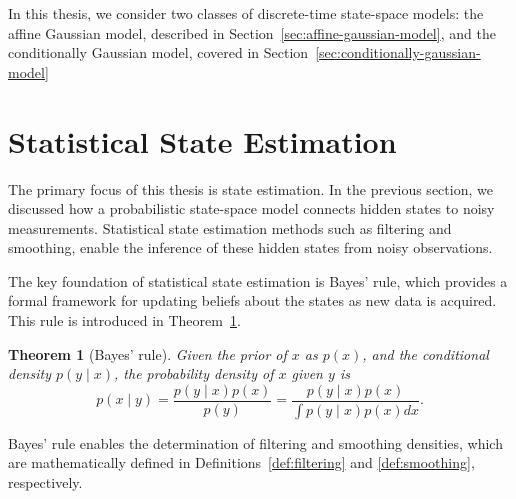 \documentclass[dissertation,math,vertlayout,pdfa,colorlinks,nologo]{aaltoseries}
\newtheorem{theorem}{Theorem}
\begin{document}
In this thesis, we consider two classes of discrete-time state-space models: the affine Gaussian model, described in Section~\ref{sec:affine-gaussian-model}, and the conditionally Gaussian model, covered in Section~\ref{sec:conditionally-gaussian-model}

\section{Statistical State Estimation}
The primary focus of this thesis is state estimation. In the previous section, we discussed how a probabilistic state-space model connects hidden states to noisy measurements. Statistical state estimation methods such as filtering and smoothing, enable the inference of these hidden states from noisy observations.

The key foundation of statistical state estimation is Bayes' rule, which provides a formal framework for updating beliefs about the states as new data is acquired. This rule is introduced in Theorem~\ref{th:Bayes-rule}.
%
\begin{theorem}[Bayes' rule] \label{th:Bayes-rule}
    Given the prior of $x$ as $p(x)$, and the conditional density $p(y \mid x)$, the probability density of $x$ given $y$ is 
    \begin{equation} \label{eq:bayes-theorem}
        p(x \mid y) = \frac{p(y \mid x) p(x)}{ p(y)} = \frac{p(y \mid x) p(x)}{\int p(y \mid x) p(x) dx}.
    \end{equation}
\end{theorem}
%
Bayes' rule enables the determination of filtering and smoothing densities, which are mathematically defined in Definitions~\ref{def:filtering} and \ref{def:smoothing}, respectively.
%
\end{document}
